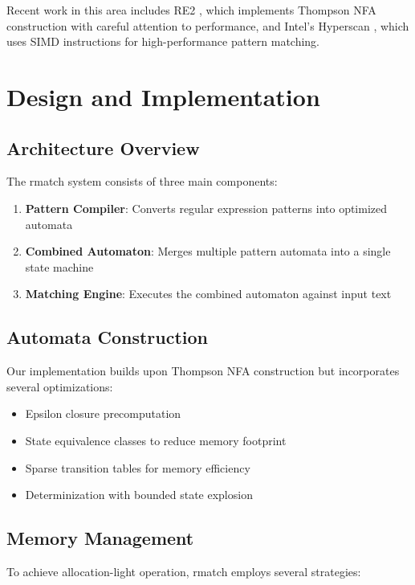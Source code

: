 \documentclass{article}
\begin{document}
Recent work in this area includes RE2 \cite{cox2007regular}, which implements Thompson NFA construction with careful attention to performance, and Intel's Hyperscan \cite{wang2019hyperscan}, which uses SIMD instructions for high-performance pattern matching.

\section{Design and Implementation}

\subsection{Architecture Overview}

The rmatch system consists of three main components: 

\begin{enumerate}
\item \textbf{Pattern Compiler}: Converts regular expression patterns into optimized automata
\item \textbf{Combined Automaton}: Merges multiple pattern automata into a single state machine
\item \textbf{Matching Engine}: Executes the combined automaton against input text
\end{enumerate}

\subsection{Automata Construction}

Our implementation builds upon Thompson NFA construction but incorporates several optimizations:

\begin{itemize}
\item Epsilon closure precomputation
\item State equivalence classes to reduce memory footprint  
\item Sparse transition tables for memory efficiency
\item Determinization with bounded state explosion
\end{itemize}

\subsection{Memory Management}

To achieve allocation-light operation, rmatch employs several strategies: 
\end{document}
